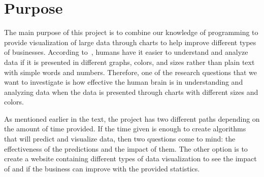 \section{Purpose}
The main purpose of this project is to combine our knowledge of programming to provide visualization of large data through charts to help improve different types of businesses. According to~\cite{pyvis}, humans have it easier to understand and analyze data if it is presented in different graphs, colors, and sizes rather than plain text with simple words and numbers. Therefore, one of the research questions that we want to investigate is how effective the human brain is in understanding and analyzing data when the data is presented through charts with different sizes and colors. 

As mentioned earlier in the text, the project has two different paths depending on the amount of time provided. If the time given is enough to create algorithms that will predict and visualize data, then two questions come to mind: the effectiveness of the predictions and the impact of them. The other option is to create a website containing different types of data visualization to see the impact of and if the business can improve with the provided statistics.  


